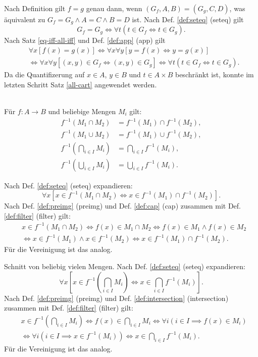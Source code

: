 \begin{Beweis}
Nach Definition gilt $f=g$ genau dann, wenn $(G_f,A,B)=(G_g,C,D)$,
was äquivalent zu $G_f=G_g\land A=C\land B=D$ ist. Nach Def.
\ref{def:seteq} (seteq) gilt
\[G_f=G_g\iff \forall t(t\in G_f\iff t\in G_g).\]
Nach Satz \ref{eq-iff-all-iff} und Def. \ref{def:app} (app) gilt
\begin{align*}
&\forall x[f(x)=g(x)] \iff \forall x\forall y[y=f(x)\iff y=g(x)]\\
&\iff \forall x\forall y[(x,y)\in G_f\iff (x,y)\in G_g]
\iff \forall t(t\in G_f\iff t\in G_g).
\end{align*}
Da die Quantifizerung auf $x\in A$, $y\in B$ und $t\in A\times B$
beschränkt ist, konnte im letzten Schritt Satz \ref{all-cart}
angewendet werden.\;\qedsymbol
\end{Beweis}

\begin{Satz}%
\mbox{}\\
Für $f\colon A\to B$ und beliebige Mengen $M_i$ gilt:
\begin{align}
f^{-1}(M_1\cap M_2) &= f^{-1}(M_1)\cap f^{-1}(M_2),\\
f^{-1}(M_1\cup M_2) &= f^{-1}(M_1)\cup f^{-1}(M_2),\\
f^{-1}(\bigcap_{i\in I} M_i) &= \bigcap_{i\in I} f^{-1}(M_i),\\
f^{-1}(\bigcup_{i\in I} M_i) &= \bigcup_{i\in I} f^{-1}(M_i).
\end{align}
\end{Satz}

\begin{Beweis}
Nach Def. \ref{def:seteq} (seteq) expandieren:
\[\forall x[x\in f^{-1}(M_1\cap M_2)\iff x\in f^{-1}(M_1)\cap f^{-1}(M_2)].\]
Nach Def. \ref{def:preimg} (preimg) und Def. \ref{def:cap} (cap)
zusammen mit Def. \ref{def:filter} (filter) gilt:
\begin{align*}
& x\in f^{-1}(M_1\cap M_2) \iff f(x)\in M_1\cap M_2
\iff f(x)\in M_1\land f(x)\in M_2\\
&\iff x\in f^{-1}(M_1)\land x\in f^{-1}(M_2)
\iff x\in f^{-1}(M_1)\cap f^{-1}(M_2).
\end{align*}
Für die Vereinigung ist das analog.

Schnitt von beliebig vielen Mengen.
Nach Def. \ref{def:seteq} (seteq) expandieren:
\[\forall x[x\in f^{-1}(\bigcap_{i\in I}M_i)
\iff x\in \bigcap_{i\in I} f^{-1}(M_i)].\]
Nach Def. \ref{def:preimg} (preimg) und Def. \ref{def:intersection}
(intersection) zusammen mit Def. \ref{def:filter} (filter) gilt:
\begin{align*}
& x\in f^{-1}(\bigcap_{i\in I} M_i)\iff f(x)\in\bigcap_{i\in I} M_i
\iff \forall i(i\in I\implies f(x)\in M_i)\\
&\iff \forall i(i\in I\implies x\in f^{-1}(M_i))
\iff x\in \bigcap_{i\in I} f^{-1}(M_i).
\end{align*}
Für die Vereinigung ist das analog.\;\qedsymbol
\end{Beweis}

